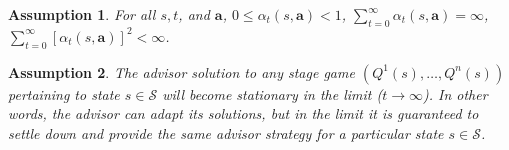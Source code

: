 \documentclass[jair, twoside,11pt,theapa]{article}
\newtheorem{assumption}{Assumption}
\begin{document}
\begin{assumption}\label{assumption:learningrate}
For all $s, t$, and $\boldsymbol{a}$, $0 \leq \alpha_t(s,\boldsymbol{a}) < 1$, $\sum_{t=0}^\infty \alpha_t(s, \boldsymbol{a}) = \infty$, $\sum_{t=0}^\infty[\alpha_t(s, \boldsymbol{a})]^2 < \infty$.

         



          
 
\end{assumption}


\begin{assumption}\label{assumption:advisorassumption}
The advisor solution to any stage game $(Q^1(s), \ldots, Q^n(s))$ pertaining to state $s \in \mathcal{S}$ will become stationary in the limit ($t \xrightarrow{} \infty$). In other words, the advisor can adapt its solutions, but in the limit it is guaranteed to settle down and provide the same advisor strategy for a particular state $s \in \mathcal{S}$. 
\end{assumption}

         
\end{document}
